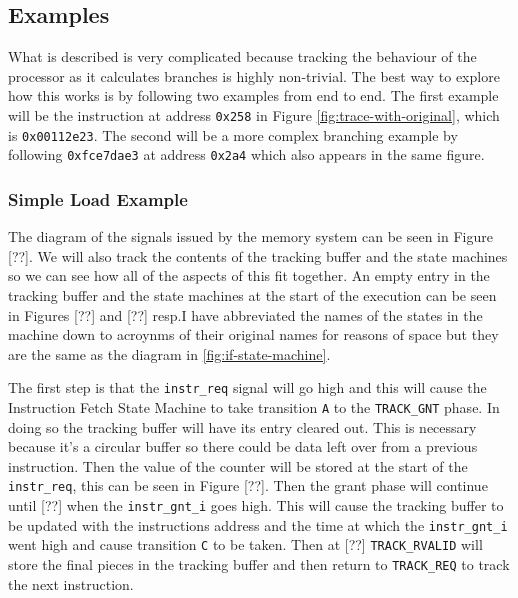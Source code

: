 \subsection{Examples}

What is described is very complicated because tracking the behaviour of the processor as it calculates branches is highly non-trivial. The best way to explore how this works is by following two examples from end to end. The first example will be the instruction at address \texttt{0x258} in Figure \ref{fig:trace-with-original}, which is \texttt{0x00112e23}. The second will be a more complex branching example by following \texttt{0xfce7dae3} at address \texttt{0x2a4} which also appears in the same figure.

\subsubsection{Simple Load Example}

The diagram of the signals issued by the memory system can be seen in Figure [??]. We will also track the contents of the tracking buffer and the state machines so we can see how all of the aspects of this fit together. An empty entry in the tracking buffer and the state machines at the start of the execution can be seen in Figures [??] and [??] resp.I have abbreviated the names of the states in the machine down to acroynms of their original names for reasons of space but they are the same as the diagram in \ref{fig:if-state-machine}. 




The first step is that the \texttt{instr\_req} signal will go high and this will cause the Instruction Fetch State Machine to take transition \texttt{A} to the \texttt{TRACK\_GNT} phase. In doing so the tracking buffer will have its entry cleared out. This is necessary because it's a circular buffer so there could be data left over from a previous instruction. Then the value of the counter will be stored at the start of the \texttt{instr\_req}, this can be seen in Figure [??]. Then the grant phase will continue until [??] when the \texttt{instr\_gnt\_i} goes high. This will cause the tracking buffer to be updated with the instructions address and the time at which the \texttt{instr\_gnt\_i} went high and cause transition \texttt{C} to be taken. Then at [??] \texttt{TRACK\_RVALID} will store the final pieces in the tracking buffer and then return to \texttt{TRACK\_REQ} to track the next instruction. 

